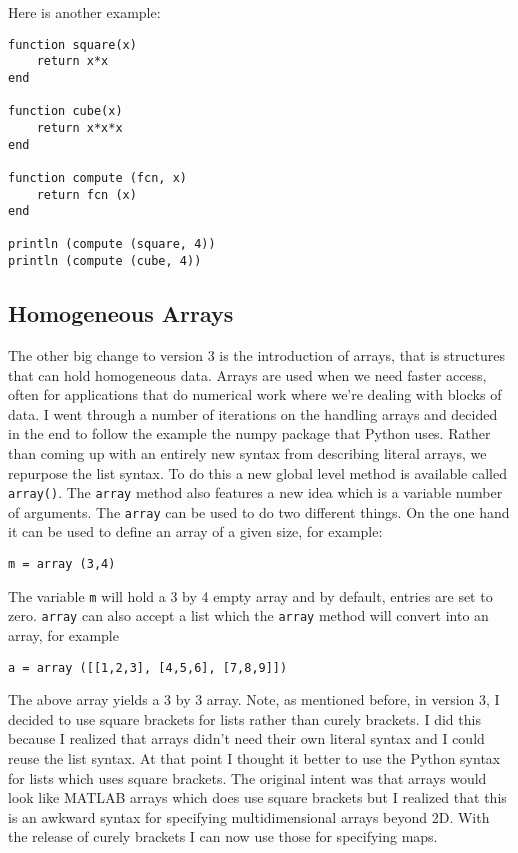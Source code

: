Here is another example:

\begin{lstlisting}
function square(x)
    return x*x
end

function cube(x)
    return x*x*x
end

function compute (fcn, x)
    return fcn (x)
end

println (compute (square, 4))
println (compute (cube, 4))
\end{lstlisting}

\subsection{Homogeneous Arrays}

The other big change to version 3 is the introduction of arrays, that is structures that can hold homogeneous data. Arrays are used when we need faster access, often for applications that do numerical work where we're dealing with blocks of data.  I went through a number of iterations on the handling arrays and decided in the end to follow the example the numpy package that Python uses. Rather than coming up with an entirely new syntax from describing literal arrays, we repurpose the list syntax. To do this a new global level method is available called {\tt array()}. The {\tt array} method also features a new idea which is a variable number of arguments. The {\tt array} can be used to do two different things. On the one hand it can be used to define an array of a given size, for example:

\begin{lstlisting}
m = array (3,4)
\end{lstlisting}

The variable {\tt m} will hold a 3 by 4 empty array and by default, entries are set to zero. {\tt array} can also accept a list which the {\tt array} method will convert into an array, for example

\begin{lstlisting}
a = array ([[1,2,3], [4,5,6], [7,8,9]])
\end{lstlisting}

The above array yields a 3 by 3 array. Note, as mentioned before, in version 3, I decided to use square brackets for lists rather than curely brackets. I did this because I realized that arrays didn't need their own literal syntax and I could reuse the list syntax. At that point I thought it better to use the Python syntax for lists which uses square brackets. The original intent was that arrays would look like MATLAB arrays which does use square brackets but I realized that this is an awkward syntax for specifying multidimensional arrays beyond 2D. With the release of curely brackets I can now use those for specifying maps.

